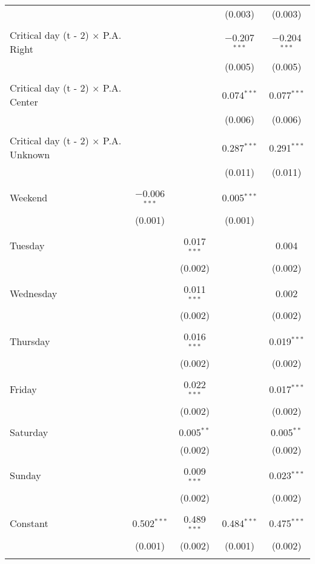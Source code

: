 \documentclass[
]{article}
\begin{document}
\begin{table}[!htbp]
{\begin{tabular}{@{\extracolsep{5pt}}lcccc}
  &  &  & (0.003) & (0.003) \\ 
  & & & & \\ 
 Critical day (t - 2) $\times$ P.A. Right &  &  & $-$0.207$^{***}$ & $-$0.204$^{***}$ \\ 
  &  &  & (0.005) & (0.005) \\ 
  & & & & \\ 
 Critical day (t - 2) $\times$ P.A. Center &  &  & 0.074$^{***}$ & 0.077$^{***}$ \\ 
  &  &  & (0.006) & (0.006) \\ 
  & & & & \\ 
 Critical day (t - 2) $\times$ P.A. Unknown &  &  & 0.287$^{***}$ & 0.291$^{***}$ \\ 
  &  &  & (0.011) & (0.011) \\ 
  & & & & \\ 
 Weekend & $-$0.006$^{***}$ &  & 0.005$^{***}$ &  \\ 
  & (0.001) &  & (0.001) &  \\ 
  & & & & \\ 
 Tuesday &  & 0.017$^{***}$ &  & 0.004 \\ 
  &  & (0.002) &  & (0.002) \\ 
  & & & & \\ 
 Wednesday &  & 0.011$^{***}$ &  & 0.002 \\ 
  &  & (0.002) &  & (0.002) \\ 
  & & & & \\ 
 Thursday &  & 0.016$^{***}$ &  & 0.019$^{***}$ \\ 
  &  & (0.002) &  & (0.002) \\ 
  & & & & \\ 
 Friday &  & 0.022$^{***}$ &  & 0.017$^{***}$ \\ 
  &  & (0.002) &  & (0.002) \\ 
  & & & & \\ 
 Saturday &  & 0.005$^{**}$ &  & 0.005$^{**}$ \\ 
  &  & (0.002) &  & (0.002) \\ 
  & & & & \\ 
 Sunday &  & 0.009$^{***}$ &  & 0.023$^{***}$ \\ 
  &  & (0.002) &  & (0.002) \\ 
  & & & & \\ 
 Constant & 0.502$^{***}$ & 0.489$^{***}$ & 0.484$^{***}$ & 0.475$^{***}$ \\ 
  & (0.001) & (0.002) & (0.001) & (0.002) \\ 
  & & & & \\ 

\end{tabular}}
\end{table}
\end{document}
